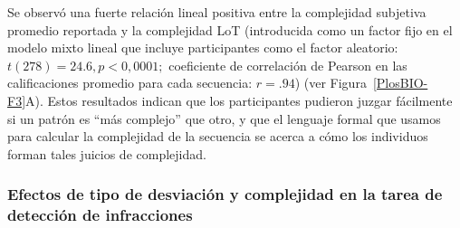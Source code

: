 Se observó una fuerte relación lineal positiva entre la complejidad subjetiva promedio reportada y la complejidad LoT (introducida como un factor fijo en el modelo mixto lineal que incluye participantes como el factor aleatorio: $t (278) = 24.6, p < 0,0001;$ coeficiente de correlación de Pearson en las calificaciones promedio para cada secuencia: $r = .94$) (ver Figura~\ref{PlosBIO-F3}A). Estos resultados indican que los participantes pudieron juzgar fácilmente si un patrón es ``más complejo'' que otro, y que el lenguaje formal que usamos para calcular la complejidad de la secuencia se acerca a cómo los individuos forman tales juicios de complejidad.

\subsubsection*{Efectos de tipo de desviación y complejidad en la tarea de detección de infracciones}


